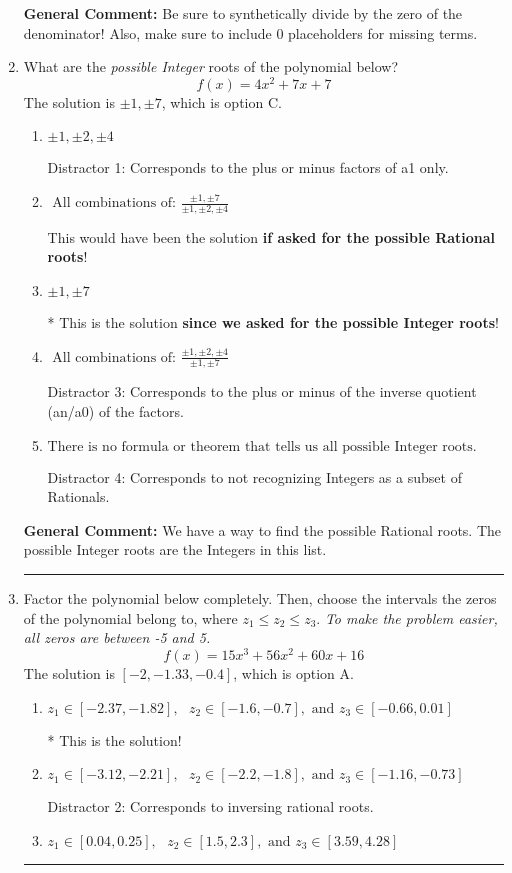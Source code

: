 \documentclass{extbook}[14pt]
\newcommand{\litem}[1]{\item #1

\rule{\textwidth}{0.4pt}}
\begin{document}
\begin{enumerate}
{\textbf{General Comment:} Be sure to synthetically divide by the zero of the denominator! Also, make sure to include 0 placeholders for missing terms.
}
\litem{
What are the \textit{possible Integer} roots of the polynomial below?
\[ f(x) = 4x^{2} +7 x + 7 \]The solution is \( \pm 1,\pm 7 \), which is option C.\begin{enumerate}[label=\Alph*.]
\item \( \pm 1,\pm 2,\pm 4 \)

 Distractor 1: Corresponds to the plus or minus factors of a1 only.
\item \( \text{ All combinations of: }\frac{\pm 1,\pm 7}{\pm 1,\pm 2,\pm 4} \)

This would have been the solution \textbf{if asked for the possible Rational roots}!
\item \( \pm 1,\pm 7 \)

* This is the solution \textbf{since we asked for the possible Integer roots}!
\item \( \text{ All combinations of: }\frac{\pm 1,\pm 2,\pm 4}{\pm 1,\pm 7} \)

 Distractor 3: Corresponds to the plus or minus of the inverse quotient (an/a0) of the factors. 
\item \( \text{There is no formula or theorem that tells us all possible Integer roots.} \)

 Distractor 4: Corresponds to not recognizing Integers as a subset of Rationals.
\end{enumerate}

\textbf{General Comment:} We have a way to find the possible Rational roots. The possible Integer roots are the Integers in this list.
}
\litem{
Factor the polynomial below completely. Then, choose the intervals the zeros of the polynomial belong to, where $z_1 \leq z_2 \leq z_3$. \textit{To make the problem easier, all zeros are between -5 and 5.}
\[ f(x) = 15x^{3} +56 x^{2} +60 x + 16 \]The solution is \( [-2, -1.33, -0.4] \), which is option A.\begin{enumerate}[label=\Alph*.]
\item \( z_1 \in [-2.37, -1.82], \text{   }  z_2 \in [-1.6, -0.7], \text{   and   } z_3 \in [-0.66, 0.01] \)

* This is the solution!
\item \( z_1 \in [-3.12, -2.21], \text{   }  z_2 \in [-2.2, -1.8], \text{   and   } z_3 \in [-1.16, -0.73] \)

 Distractor 2: Corresponds to inversing rational roots.
\item \( z_1 \in [0.04, 0.25], \text{   }  z_2 \in [1.5, 2.3], \text{   and   } z_3 \in [3.59, 4.28] \)


\end{enumerate}}
\end{enumerate}
\end{document}
